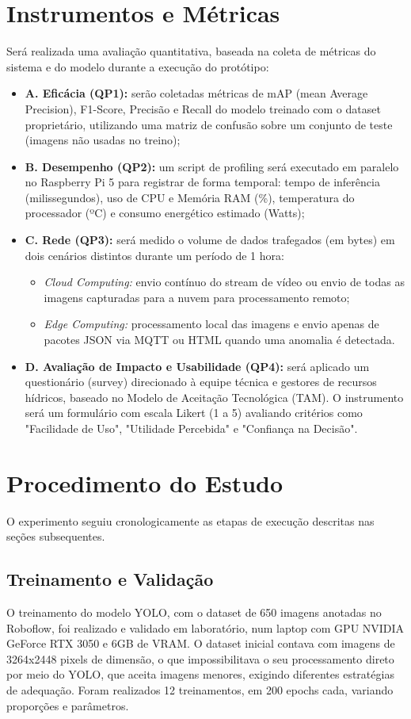 \section{Instrumentos e Métricas}
Será realizada uma avaliação quantitativa, baseada na coleta de métricas do sistema e do modelo durante a execução do protótipo:
\begin{itemize}
    \item \textbf{A. Eficácia (QP1):} serão coletadas métricas de mAP (mean Average Precision), F1-Score, Precisão e Recall do modelo treinado com o dataset proprietário, utilizando uma matriz de confusão sobre um conjunto de teste (imagens não usadas no treino);
    \item \textbf{B. Desempenho (QP2):} um script de profiling será executado em paralelo no Raspberry Pi 5 para registrar de forma temporal: tempo de inferência (milissegundos), uso de CPU e Memória RAM (\%), temperatura do processador (ºC) e consumo energético estimado (Watts);
    \item \textbf{C. Rede (QP3):} será medido o volume de dados trafegados (em bytes) em dois cenários distintos durante um período de 1 hora:
    \begin{itemize}
        \item \textit{Cloud Computing:} envio contínuo do stream de vídeo ou envio de todas as imagens capturadas para a nuvem para processamento remoto;
        \item \textit{Edge Computing:} processamento local das imagens e envio apenas de pacotes JSON via MQTT ou HTML quando uma anomalia é detectada.
    \end{itemize}
    \item \textbf{D. Avaliação de Impacto e Usabilidade (QP4):} será aplicado um questionário (survey) direcionado à equipe técnica e gestores de recursos hídricos, baseado no Modelo de Aceitação Tecnológica (TAM). O instrumento será um formulário com escala Likert (1 a 5) avaliando critérios como "Facilidade de Uso", "Utilidade Percebida" e "Confiança na Decisão".
\end{itemize}

\section{Procedimento do Estudo}
O experimento seguiu cronologicamente as etapas de execução descritas nas seções subsequentes.

\subsection{Treinamento e Validação}
O treinamento do modelo YOLO, com o dataset de 650 imagens anotadas no Roboflow, foi realizado e validado em laboratório, num laptop com GPU NVIDIA GeForce RTX 3050 e 6GB de VRAM. O dataset inicial contava com imagens de 3264x2448 pixels de dimensão, o que impossibilitava o seu processamento direto por meio do YOLO, que aceita imagens menores, exigindo diferentes estratégias de adequação. Foram realizados 12 treinamentos, em 200 epochs cada, variando proporções e parâmetros.

